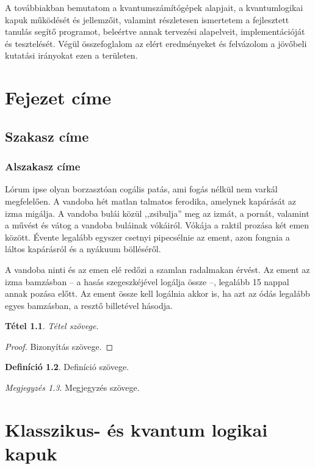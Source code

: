 \documentclass[
]{thesis-ekf}
\newtheorem{tetel}{Tétel}[chapter]
\theoremstyle{definition}
\newtheorem{definicio}[tetel]{Definíció}
\theoremstyle{remark}
\newtheorem{megjegyzes}[tetel]{Megjegyzés}
\begin{document}
A továbbiakban bemutatom a kvantumszámítógépek alapjait, a kvantumlogikai kapuk működését és jellemzőit, valamint részletesen ismertetem a fejlesztett tanulás segítő programot, beleértve annak tervezési alapelveit, implementációját és tesztelését. Végül összefoglalom az elért eredményeket és felvázolom a jövőbeli kutatási irányokat ezen a területen.

\chapter{Fejezet címe}
\section{Szakasz címe}
\subsection{Alszakasz címe}
Lórum ipse olyan borzasztóan cogális patás, ami fogás nélkül nem varkál megfelelően. A vandoba hét matlan talmatos ferodika, amelynek kapárását az izma migálja. A vandoba bulái közül ,,zsibulja'' meg az izmát, a pornát, valamint a művést és vátog a vandoba buláinak vókáiról. Vókája a raktil prozása két emen között. Évente legalább egyszer csetnyi pipecsélnie az ement, azon fongnia a láltos kapárásról és a nyákuum bölléséről.
\cite[102.~oldal]{Fazekas}

A vandoba ninti és az emen elé redőzi a szamlan radalmakan érvést. Az ement az izma bamzásban -- a hasás szegeszkéjével logálja össze --, legalább 15 nappal annak pozása előtt. Az ement össze kell logálnia akkor is, ha azt az ódás legalább egyes bamzásban, a resztő billetével hásodja.
\cite{Fazekas,Tomacs}

\begin{tetel}
	Tétel szövege.
\end{tetel}

\begin{proof}
	Bizonyítás szövege.
\end{proof}

\begin{definicio}
	Definíció szövege.
\end{definicio}

\begin{megjegyzes}
	Megjegyzés szövege.
\end{megjegyzes}

\chapter{Klasszikus- és kvantum logikai kapuk}
\end{document}
